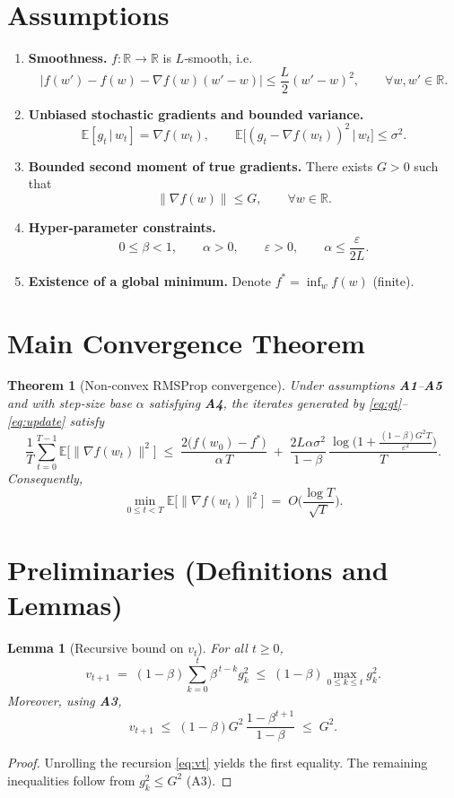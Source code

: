 \documentclass[11pt]{article}
\newtheorem{theorem}{Theorem}
\newtheorem{lemma}{Lemma}
\newcommand{\E}{\mathbb{E}}
\newcommand{\R}{\mathbb{R}}
\begin{document}
\section*{Assumptions}
\begin{enumerate}[label={\bf A\arabic*:}, leftmargin=*]
\item \textbf{Smoothness.} $f:\R\to\R$ is $L$‑smooth, i.e.
\[
|f(w')-f(w)-\nabla f(w)(w'-w)|\le \frac{L}{2}(w'-w)^2,\qquad\forall w,w'\in\R. \tag{A1}
\]

\item \textbf{Unbiased stochastic gradients and bounded variance.}
\[
\E[g_t\,|\,w_t]=\nabla f(w_t),\qquad 
\E\big[(g_t-\nabla f(w_t))^{2}\,\big|\,w_t\big]\le\sigma^{2}. \tag{A2}
\]

\item \textbf{Bounded second moment of true gradients.}
There exists $G>0$ such that
\[
\|\nabla f(w)\|\le G,\qquad\forall w\in\R. \tag{A3}
\]

\item \textbf{Hyper‑parameter constraints.}
\[
0\le\beta<1,\qquad \alpha>0,\qquad \varepsilon>0,\qquad 
\alpha\le \frac{\varepsilon}{2L}. \tag{A4}
\]

\item \textbf{Existence of a global minimum.}
Denote $f^{*}= \inf_{w}f(w)$ (finite). 
\end{enumerate}

\section*{Main Convergence Theorem}
\begin{theorem}[Non‑convex RMSProp convergence]\label{thm:main}
Under assumptions \textbf{A1}–\textbf{A5} and with step‑size base $\alpha$ satisfying \textbf{A4}, the iterates generated by \eqref{eq:gt}–\eqref{eq:update} satisfy
\[
\frac{1}{T}\sum_{t=0}^{T-1}\E\big[\|\nabla f(w_t)\|^{2}\big]\;\le\;
\frac{2\big(f(w_0)-f^{*}\big)}{\alpha\,T}
\;+\;
\frac{2L\alpha\sigma^{2}}{1-\beta}\,
\frac{\log\!\big(1+\tfrac{(1-\beta)G^{2}T}{\varepsilon^{2}}\big)}{T}. \tag{1}
\]
Consequently,
\[
\min_{0\le t<T}\E\big[\|\nabla f(w_t)\|^{2}\big]\;=\;O\!\bigg(\frac{\log T}{\sqrt{T}}\bigg).
\]
\end{theorem}

\section*{Preliminaries (Definitions and Lemmas)}
\begin{lemma}[Recursive bound on $v_t$]\label{lem:vtbound}
For all $t\ge0$,
\[
v_{t+1}\;=\;(1-\beta)\sum_{k=0}^{t}\beta^{\,t-k} g_k^{2}
\;\le\;(1-\beta)\max_{0\le k\le t} g_k^{2}.
\]
Moreover, using \textbf{A3},
\[
v_{t+1}\;\le\;(1-\beta)G^{2}\,\frac{1-\beta^{t+1}}{1-\beta}
\;\le\;G^{2}. \tag{2}
\]
\end{lemma}
\begin{proof}
Unrolling the recursion \eqref{eq:vt} yields the first equality.  The remaining inequalities follow from $g_k^{2}\le G^{2}$ (A3). \qedhere
\end{proof}
\end{document}
